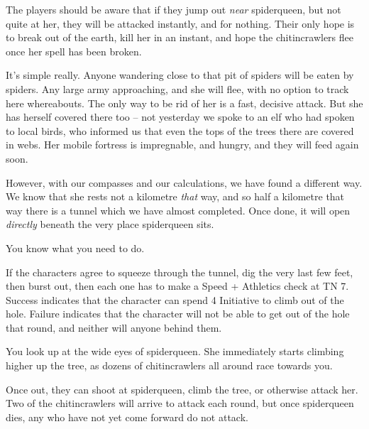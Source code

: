 \begin{multicols}{2}
The players should be aware that if they jump out \emph{near} \gls{spiderqueen}, but not quite at her, they will be attacked instantly, and for nothing.  Their only hope is to break out of the earth, kill her in an instant, and hope the chitincrawlers flee once her spell has been broken.

\begin{speechtext}

	It's simple really.  Anyone wandering close to that pit of spiders will be eaten by spiders.  Any large army approaching, and she will flee, with no option to track here whereabouts.  The only way to be rid of her is a fast, decisive attack.  But she has herself covered there too -- not yesterday we spoke to an elf who had spoken to local birds, who informed us that even the tops of the trees there are covered in webs.  Her mobile fortress is impregnable, and hungry, and they will feed again soon.

	However, with our compasses and our calculations, we have found a different way.
	We know that she rests not a kilometre \emph{that} way, and so half a kilometre that way there is a tunnel which we have almost completed.
	Once done, it will open \emph{directly} beneath the very place \gls{spiderqueen} sits.

	You know what you need to do.

\end{speechtext}

If the characters agree to squeeze through the tunnel, dig the very last few feet, then burst out, then each one has to make a Speed + Athletics check at TN 7.  Success indicates that the character can spend 4 Initiative to climb out of the hole.  Failure indicates that the character will not be able to get out of the hole that round, and neither will anyone behind them.

\begin{boxtext}

	You look up at the wide eyes of \gls{spiderqueen}. She immediately starts climbing higher up the tree, as dozens of chitincrawlers all around race towards you.

\end{boxtext}

Once out, they can shoot at \gls{spiderqueen}, climb the tree, or otherwise attack her.  Two of the chitincrawlers will arrive to attack each round, but once \gls{spiderqueen} dies, any who have not yet come forward do not attack.



\end{multicols}
